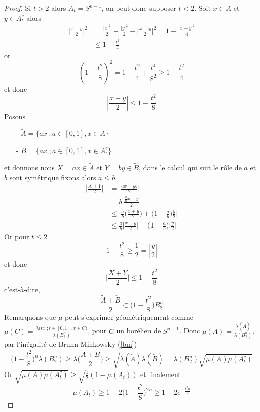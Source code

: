 \documentclass[12pt]{article}
\theoremstyle{definition}
\begin{document}
\begin{proof}
	Si $t>2$ alors $A_t=S^{n-1}$, on peut donc supposer $t<2$. Soit $x\in A$ et $y\in A^{c}_t$ alors \begin{align*}
	\big|\frac{x+y}{2}\big|^2&=\frac{|x|^2}{2}+\frac{|y|^2}{2}-\big|\frac{x-y}{2}\big|^2=1-\frac{|x-y|^2}{4}\\
	&\leq 1-\frac{t^2}{4}
	\end{align*}
	or 
	\begin{equation*}
	(1-\frac{t^2}{8})^2 =1-\frac{t^2}{4}+\frac{t^4}{8^2}\geq 1-\frac{t^2}{4}
	\end{equation*}
	et donc 
	\begin{equation*}
	|\frac{x-y}{2}|\leq 1-\frac{t^2}{8}
	\end{equation*}
	Posons \begin{enumerate}
		\item[-] $\tilde{A}=\big\{ax\;; a\in[0,1], x\in A\big\}$ 
		\item[-]  $\tilde{B}=\big\{ax\;; a\in[0,1], x\in A_t^c\big\}$
	\end{enumerate} 
	et donnons nous $X=ax\in \tilde{A}$ et $Y=by\in \tilde{B}$, dans le calcul qui suit le rôle de $a$ et $b$ sont symétrique fixons alors $a\leq b$,
	\begin{align*}
	\Big|\frac{X+Y}{2}\Big|&= \Big|\frac{ax+yb}{2}\Big|\\
	&=b\Big|\frac{\frac{a}{b}x+y}{2}\Big|\\
	&\leq \Big|\frac{a}{b}\big(\frac{x+y}{2}\big)+\big(1-\frac{a}{b}\big)\frac{y}{2}\Big|\\
	&\leq \frac{a}{b}\Big|\frac{x+y}{2}\Big|+\big(1-\frac{a}{b}\big)\big|\frac{y}{2}\big|
	\end{align*}
	Or pour $t\leq 2$
	\begin{equation*}
	1-\frac{t^2}{8}\geq \frac{1}{2} = |\frac{y}{2}|
	\end{equation*}
	et donc 
	\begin{equation*}
	\Big|\frac{X+Y}{2}\Big|\leq 1-\frac{t^2}{8}
	\end{equation*}
	c'est-à-dire,
	\begin{equation*}
	\frac{\tilde{A}+\tilde{B}}{2}\subset \big(1-\frac{t^2}{8}\big)B^n_2
	\end{equation*}
	Remarquons que $\mu$ peut s'exprimer géométriquement comme $\mu(C)=\frac{\lambda\big(tx \; ; t\in[0,1], x\in C \big)}{\lambda(B^n_2)}$, pour $C$ un borélien de $S^{n-1}$. Donc $\mu(A)=\frac{\lambda(\tilde{A})}{\lambda(B^n_2)}$, par l'inégalité de Brunn-Minkowsky (\cref{bm})
	\begin{equation*}
	\big(1-\frac{t^2}{8}\big)^{n}\lambda(B^n_2)\geq \lambda\big(\frac{\tilde{A}+\tilde{B}}{2}\big)\geq \sqrt{\lambda(\tilde{A})\lambda(\tilde{B})}=\lambda(B^n_2)\sqrt{\mu(A)\mu(A_t^c)}
	\end{equation*}
	Or $\sqrt{\mu(A)\mu(A_t^c)}\geq\sqrt{\frac{1}{2}(1-\mu(A_t))}$ et finalement :
	\begin{equation*}
	\mu(A_t)\geq 1 - 2 \big(1-\frac{t^2}{8}\big)^{2n}\geq 1 - 2 e^{-\frac{t^2n}{4}}
	\end{equation*}
\end{proof}
\end{document}
